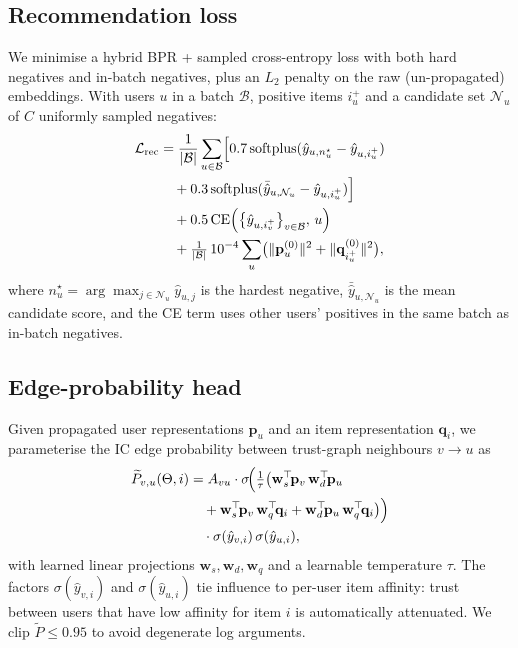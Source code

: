 \documentclass[conference]{IEEEtran}
\begin{document}
\subsection{Recommendation loss}
We minimise a hybrid BPR + sampled cross-entropy loss with both hard
negatives and in-batch negatives, plus an $L_2$ penalty on the raw
(un-propagated) embeddings. With users $u$ in a batch
$\mathcal{B}$, positive items $i^+_u$ and a candidate set
$\mathcal{N}_u$ of $C$ uniformly sampled negatives:
\begin{align}
\mathcal{L}_{\text{rec}} &=
\frac{1}{|\mathcal{B}|}\sum_{u\in\mathcal{B}}\Bigl[
0.7\,\mathrm{softplus}(\hat y_{u,n^\star_u}-\hat y_{u,i^+_u}) \nonumber\\
&\quad+ 0.3\,\mathrm{softplus}(\bar{\hat y}_{u,\mathcal{N}_u}-\hat y_{u,i^+_u})\Bigr] \nonumber\\
&\quad+ 0.5\,\mathrm{CE}\!\left(\bigl\{\hat y_{u,i^+_v}\bigr\}_{v\in\mathcal{B}},\, u\right) \nonumber\\
&\quad+ \tfrac{1}{|\mathcal{B}|}\,10^{-4}\sum_{u}\bigl(\lVert\mathbf{p}^{(0)}_u\rVert^2+\lVert\mathbf{q}^{(0)}_{i^+_u}\rVert^2\bigr),
\label{eq:recloss}
\end{align}
where $n^\star_u=\arg\max_{j\in\mathcal{N}_u}\hat y_{u,j}$ is the
hardest negative, $\bar{\hat y}_{u,\mathcal{N}_u}$ is the mean candidate
score, and the CE term uses other users' positives in the same batch as
in-batch negatives.

\subsection{Edge-probability head}
Given propagated user representations $\mathbf{p}_u$ and an item
representation $\mathbf{q}_i$, we parameterise the IC edge probability
between trust-graph neighbours $v\!\to\!u$ as
\begin{align}
\widetilde{P}_{v,u}(\Theta,i)
&=A_{vu}\cdot\sigma\!\Bigl(\tfrac{1}{\tau}\bigl(\mathbf{w}_s^\top\!\mathbf{p}_v\,\mathbf{w}_d^\top\!\mathbf{p}_u \nonumber\\
&\quad+\mathbf{w}_s^\top\!\mathbf{p}_v\,\mathbf{w}_q^\top\!\mathbf{q}_i+\mathbf{w}_d^\top\!\mathbf{p}_u\,\mathbf{w}_q^\top\!\mathbf{q}_i\bigr)\Bigr) \nonumber\\
&\quad\cdot\sigma(\hat y_{v,i})\,\sigma(\hat y_{u,i}),
\label{eq:edgeprob}
\end{align}
with learned linear projections $\mathbf{w}_s,\mathbf{w}_d,\mathbf{w}_q$
and a learnable temperature $\tau$. The factors $\sigma(\hat y_{v,i})$
and $\sigma(\hat y_{u,i})$ tie influence to per-user item affinity:
trust between users that have low affinity for item $i$ is automatically
attenuated. We clip $\widetilde P\le 0.95$ to avoid degenerate log
arguments.
\end{document}
